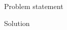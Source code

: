 \documentclass{article}
\begin{document}
\setcounter{section}{1000} %
\begin{exercise}
Problem statement
\end{exercise}
\begin{solution}
Solution
\end{solution}
\end{document}
